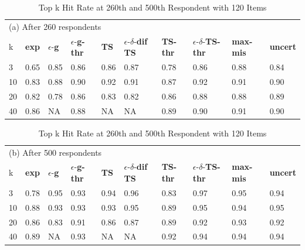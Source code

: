 \documentclass[nonblindrev]{informs3}
\newcommand{\fixedexpressS}{\textbf{exp}}
\newcommand{\egreedyS}{$\epsilon$-\textbf{g}}
\newcommand{\egreedythresS}{$\epsilon$-\textbf{g-thr}}
\newcommand{\misminS}{\textbf{max-mis}}
\newcommand{\tsS}{\textbf{TS} }
\newcommand{\edtsS}{$\epsilon$-$\delta$-\textbf{dif TS} }
\newcommand{\tsthresS}{\textbf{TS-thr} }
\newcommand{\edtsthresS}{$\epsilon$-$\delta$-\textbf{TS-thr} }
\newcommand{\uncertS}{\textbf{uncert} }
\begin{document}
\begin{table}
\caption{Top k Hit Rate at 260th and 500th Respondent with 120 Items}
\label{table:at_260_500}
\begin{center}
\begin{tabular}{llllllllll}
\hline 
\hline
\multicolumn{10}{l}{(a) After 260 respondents}\\
k &  \fixedexpressS&\egreedyS&\egreedythresS&\tsS&\edtsS&\tsthresS&\edtsthresS& \misminS& \uncertS \\ \hline
  3 & 0.65 &   0.85 &  0.86 &   0.86 & 0.87 & 0.78 & 0.86 &    0.88 &   0.84 \\
  10 &  0.83 &   0.88 & 0.90 &   0.92 & 0.91 & 0.87 & 0.92 &    0.91 &   0.90 \\
  20 & 0.82 & 0.78 &  0.86 & 0.83 & 0.82 & 0.86 & 0.88 &  0.88 &   0.89 \\  
  40 &  0.86 &   NA &  0.88 &  NA & NA & 0.89 & 0.90 &  0.91 &   0.90 \\
\hline
\hline
\end{tabular}
\begin{tabular}{llllllllll}
\multicolumn{10}{l}{(b) After 500 respondents}\\
k &  \fixedexpressS&\egreedyS&\egreedythresS&\tsS&\edtsS&\tsthresS&\edtsthresS& \misminS& \uncertS  \\
\hline
   3 & 0.78 &   0.95 & 0.93 & 0.94 & 0.96 & 0.83 & 0.97 &    0.95 &   0.94 \\
  10 &  0.88 &   0.93 &  0.93 &   0.93 & 0.95 & 0.89 & 0.95 &    0.94 &   0.95 \\  
  20 &  0.86 &   0.83 & 0.91 &  0.86 & 0.87 & 0.89 & 0.92 &  0.93 &   0.92 \\ 
  40 &  0.89 &   NA & 0.93 & NA & NA & 0.92 &  0.94 & 0.94 & 0.94 \\
\hline 
\hline
\end{tabular}
\end{center}
\end{table}

\end{document}
